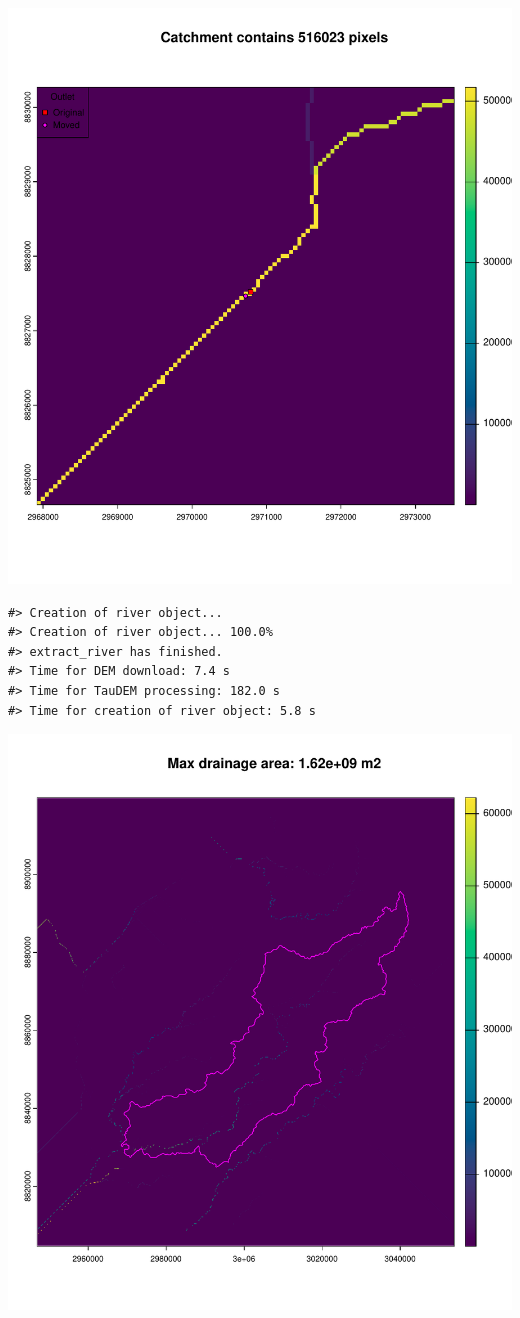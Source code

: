 \documentclass[
]{article}
\begin{document}
\includegraphics{Illustrating_eDITH_files/figure-latex/unnamed-chunk-5-1.pdf}

\begin{verbatim}
#> Creation of river object...
#> Creation of river object... 100.0%
#> extract_river has finished.
#> Time for DEM download: 7.4 s
#> Time for TauDEM processing: 182.0 s
#> Time for creation of river object: 5.8 s
\end{verbatim}

\includegraphics{Illustrating_eDITH_files/figure-latex/unnamed-chunk-5-2.pdf}
\end{document}
